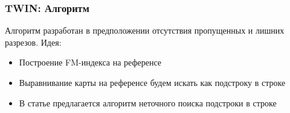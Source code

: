 
\begin{frame}
\frametitle{TWIN\nocite{twin}: Алгоритм}
Алгоритм разработан в предположении отсутствия пропущенных и лишних разрезов.
Идея:
\begin{itemize}
  \item Построение FM-индекса на референсе
  \item Выравнивание карты на референсе будем искать как подстроку в строке
  \item В статье предлагается алгоритм неточного поиска подстроки в строке
\end{itemize}


\end{frame}
